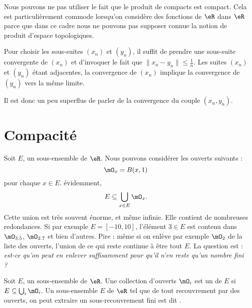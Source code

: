 \begin{remark}
    Nous pouvons ne pas utiliser le fait que le produit de compacts est compact. Cela est particulièrement commode lorsqu'on considère des fonctions de \( \eR\) dans \( \eR\) parce que dans ce cadre nous ne pouvons pas supposer connue la notion de produit d'espace topologiques.

    Pour choisir les sous-suites \( (x_n)\) et \( (y_n)\), il suffit de prendre une sous-suite convergente de \( (x_n)\) et d'invoquer le fait que \( \| x_n-y_n \|\leq \frac{1}{ n }\). Les suites \( (x_n)\) et \( (y_n)\) étant adjacentes, la convergence de \( (x_n)\) implique la convergence de \( (y_n)\) vers la même limite.

    Il est donc un peu superflus de parler de la convergence du couple \( (x_n,y_n)\).
\end{remark}

\section{Compacité}

Soit $E$, un sous-ensemble de $\eR$. Nous pouvons considérer les ouverts suivants : 
\begin{equation}
    \mO_x=B(x,1)
\end{equation}
pour chaque $x\in E$. évidemment,
\begin{equation}
    E\subseteq \bigcup_{x\in E}\mO_x.
\end{equation}
Cette union est très souvent énorme, et même infinie. Elle contient de nombreuses redondances. Si par exemple $E=[-10,10]$, l'élément $3\in E$ est contenu dans $\mO_{3.5}$, $\mO_{2.7}$ et bien d'autres. Pire : même si on enlève par exemple $\mO_2$ de la liste des ouverts, l'union de ce qui reste continue à être tout $E$. La question est : \emph{est-ce qu'on peut en enlever suffisamment pour qu'il n'en reste qu'un nombre fini ?}
\begin{definition}
Soit $E$, un sous-ensemble de $\eR$. Une collection d'ouverts $\mO_i$ est un  de $E$ si $E\subseteq \bigcup_{i}\mO_i$. Un sous-ensemble $E$ de $\eR$ tel que de tout recouvrement par des ouverts, on peut extraire un sous-recouvrement fini est dit .
\end{definition}

